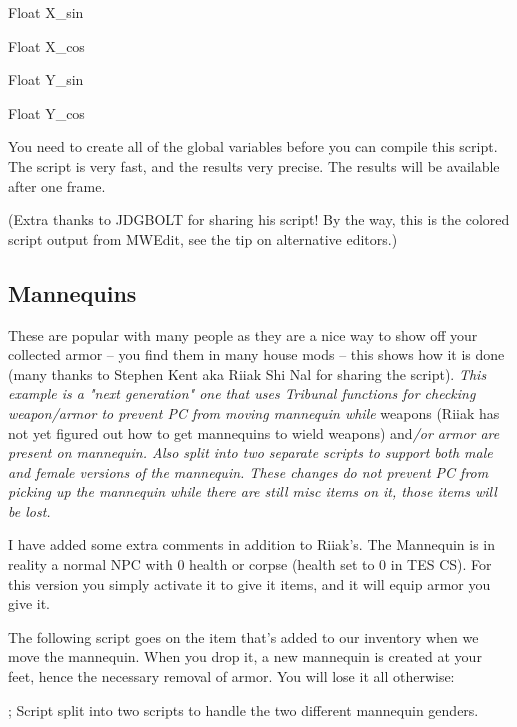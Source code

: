 \documentclass[
]{article}
\begin{document}
Float X\_sin

Float X\_cos

Float Y\_sin

Float Y\_cos

You need to create all of the global variables before you can compile
this script. The script is very fast, and the results very precise. The
results will be available after one frame.

(Extra thanks to JDGBOLT for sharing his script! By the way, this is the
colored script output from MWEdit, see the tip on alternative editors.)



\hypertarget{mannequins}{%
\subsection{\texorpdfstring{\hfill\break
Mannequins}{ Mannequins}}\label{mannequins}}

These are popular with many people as they are a nice way to show off
your collected armor -- you find them in many house mods -- this shows
how it is done (many thanks to Stephen Kent aka Riiak Shi Nal for
sharing the script). \emph{This example is a "next generation" one that
uses Tribunal functions for checking weapon/armor to prevent PC from
moving mannequin while} weapons (Riiak has not yet figured out how to
get mannequins to wield weapons) and\emph{/or armor are present on
mannequin. Also split into two separate scripts to support both male and
female versions of the mannequin. These changes do not prevent PC from
picking up the mannequin while there are still misc items on it, those
items will be lost.}

I have added some extra comments in addition to Riiak's. The Mannequin
is in reality a normal NPC with 0 health or corpse (health set to 0 in
TES CS). For this version you simply activate it to give it items, and
it will equip armor you give it.



The following script goes on the item that's added to our inventory when
we move the mannequin. When you drop it, a new mannequin is created at
your feet, hence the necessary removal of armor. You will lose it all
otherwise:

; Script split into two scripts to handle the two different mannequin
genders.

\end{document}
